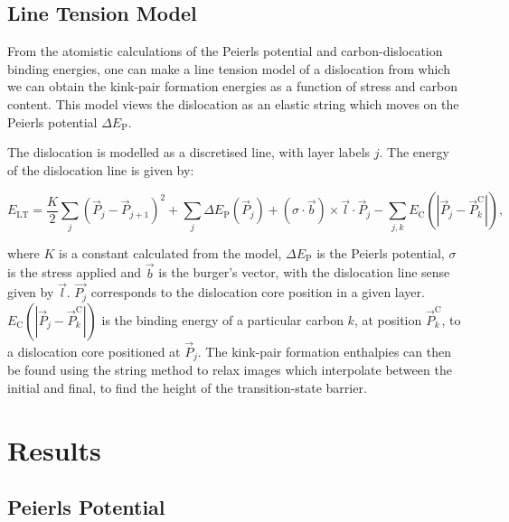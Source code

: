 \documentclass[a4paper,11pt]{article}
\begin{document}
\subsection{Line Tension Model}
\label{sec:orga989cbf}

From the atomistic calculations of the Peierls potential and carbon-dislocation binding energies, one can make a
line tension model of a dislocation from which we can obtain the kink-pair formation energies as
a function of stress and carbon content. This model views the dislocation as an elastic string
which moves on the Peierls potential \(\Delta E_{\text{P}}\).

The dislocation is modelled as a discretised line, with layer labels \(j\). The energy of the
dislocation line is given by:

\[ E_{\text{LT}} = \frac{K}{2} \sum_j (\vec{P}_j - \vec{P}_{j+1} )^2  + \sum_j \Delta E_{\text{P}}  (\vec{P}_j) +
   (\sigma \cdot \vec{b}) \times \vec{l} \cdot \vec{P}_j  - \sum_{j,k} E_{\text{C}} (|\vec{P}_j-\vec{P}_k^{\text{C}}|), \]

where \(K\) is a constant calculated from the model, \(\Delta E_{\text{P}}\) is the Peierls potential, \(\sigma\) is
the stress applied and \(\vec{b}\) is the burger's vector, with the dislocation line sense given by
\(\vec{l}\). \(\vec{P_{j}}\) corresponds to the dislocation core position in a given
layer. \(E_{\text{C}} (|\vec{P}_j-\vec{P}_k^{\text{C}}|)\) is the binding energy of a particular carbon
\(k\), at position \(\vec{P}_k^{\text{C}}\), to a dislocation core positioned at \(\vec{P}_j\). The kink-pair
formation enthalpies can then be found using the string method to
relax images which interpolate between the initial and final, to find the height of the transition-state
barrier. 

\section{Results}
\label{sec:org7a8601f}

\subsection{Peierls Potential}
\label{sec:orgbd359dd}
\end{document}
